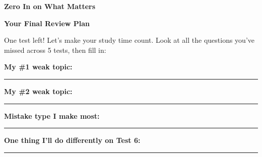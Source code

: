 \clearpage
\thispagestyle{empty}
{\sffamily

\begin{center}
{\fontsize{22}{26}\selectfont\bfseries\color{funTeal} \faBullseye\hspace{3mm}Zero In on What Matters\hspace{3mm}\faBullseye}

\vspace{2mm}
{\color{funGray}\hrulefill}
\end{center}

\vspace{3mm}

\begin{tcolorbox}[
    enhanced,
    colback=funTealLight,
    colframe=funTeal!50,
    arc=10pt,
    boxrule=1.5pt,
    left=6mm, right=6mm, top=5mm, bottom=5mm,
]
{\large\bfseries\color{funTealDark} \faCrosshairs\hspace{2mm}Your Final Review Plan}

\vspace{2mm}

One test left! Let's make your study time count. Look at all the questions you've missed across 5 tests, then fill in:

\vspace{3mm}

\textcolor{funTeal}{\faArrowRight}\hspace{2mm}\textbf{My \#1 weak topic:} \rule[-2pt]{5.5cm}{0.5pt}

\vspace{2mm}

\textcolor{funTeal}{\faArrowRight}\hspace{2mm}\textbf{My \#2 weak topic:} \rule[-2pt]{5.5cm}{0.5pt}

\vspace{2mm}

\textcolor{funTeal}{\faArrowRight}\hspace{2mm}\textbf{Mistake type I make most:} \rule[-2pt]{4.5cm}{0.5pt}

\vspace{3mm}

\textcolor{funTeal}{\faArrowRight}\hspace{2mm}\textbf{One thing I'll do differently on Test 6:}

\rule[-2pt]{\linewidth}{0.5pt}
\end{tcolorbox}

\vspace{3mm}

}
